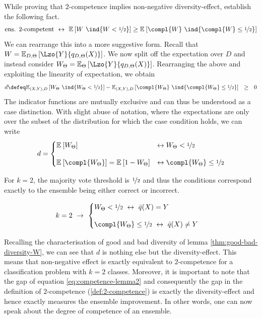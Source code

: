 \documentclass[../main.tex]{subfiles}
\begin{document}
While proving that $2$-competence implies non-negative diversity-effect, \citeauthor{theisen_WhenAreEnsembles_2023} establish the following fact.
\begin{align}
\label{eq:competence-lemma2}
\text{ens. $2$-competent} ~\leftrightarrow~ \mathbb{E}_{}\left[ W~\ind{W < \nicefrac{1}{2}} \right] \geq \mathbb{E}_{}\left[ 
\compl{W}~\ind{\compl{W} \leq \nicefrac{1}{2} } 
\right] 
\end{align}
We can rearrange this into a more suggestive form. Recall that $W = \mathbb{E}_{D, \Theta}\left[ \Lzo{Y}{q_{D,\Theta}(X)} \right]$. We now split off the expectation over $D$ and instead consider $W_{\Theta} = \mathbb{E}_{\Theta}\left[ \Lzo{Y}{q_{D, \Theta}(X)} \right]$. Rearranging the above and exploiting the linearity of expectation, we obtain
$$
d \defeq \mathbb{E}_{(X,Y),D }\left[ W_{\Theta} ~\ind{W_{\Theta} < \nicefrac{1}{2}} \right]  - \mathbb{E}_{(X,Y) ,D}\left[ \compl{W_{\Theta}} ~\ind{\compl{W_{\Theta}} \leq \nicefrac{1}{2} } \right] ~ ~ \geq ~ ~  0
$$
The indicator functions are mutually exclusive and can thus be understood as a case distinction. With slight abuse of notation, where the expectations are only over the subset of the distribution for which the case condition holds, we can write
$$
d = 
\begin{cases}
\mathbb{E}_{}\left[ W_{\Theta} \right] & \leftrightarrow W_{\Theta} < \nicefrac{1}{2} \\[1em]
\mathbb{E}_{}\left[ \compl{W_{\Theta}}  \right]  = \mathbb{E}_{}\left[ 1 - W_{\Theta} \right]  & \leftrightarrow \compl{W_{\Theta}} \leq \nicefrac{1}{2} 
\end{cases}
$$

For $k=2$, the majority vote threshold is $\nicefrac{1}{2}$ and thus the conditions correspond exactly to the ensemble being either correct or incorrect.

\begin{align}
\label{eq:gen-error-ratio-binary}
k = 2 ~\rightarrow~ 
\begin{cases}
W_{\Theta}  < \nicefrac{1}{2} ~\leftrightarrow~  \bar{q}(X) = Y \\[1em]
\compl{W_\Theta }  \leq \nicefrac{1}{2} ~\leftrightarrow~ \bar{q}(X) \not= Y
\end{cases}
\end{align}

Recalling the characterisation of good and bad diversity of lemma \ref{thm:good-bad-diversity-W}, we can see that $d$ is nothing else but the diversity-effect. This means that non-negative effect is exactly equivalent to $2$-competence for a classification problem with $k=2$ classes.
Moreover, it is important to note that the gap of equation \ref{eq:competence-lemma2} and consequently the gap in the definition of $2$-competence (\ref{def:2-competence}) is exactly the diversity-effect and hence exactly measures the ensemble improvement. In other words, one can now speak about the degree of competence of an ensemble.
\end{document}

